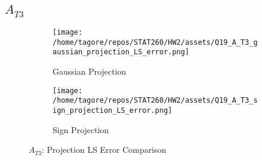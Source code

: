 \documentclass{article}
\begin{document}
\subsection*{\(A_{T3}\)}
\begin{figure}[H]
    \centering
    \begin{subfigure}[b]{0.48\textwidth}
        \centering
        \texttt{[image: /home/tagore/repos/STAT260/HW2/assets/Q19\_A\_T3\_gaussian\_projection\_LS\_error.png]}
        \caption{Gaussian Projection}
        \label{fig:Q19_AT3_gaussian}
    \end{subfigure}
    \hfill
    \begin{subfigure}[b]{0.48\textwidth}
        \centering
        \texttt{[image: /home/tagore/repos/STAT260/HW2/assets/Q19\_A\_T3\_sign\_projection\_LS\_error.png]}
        \caption{Sign Projection}
        \label{fig:Q19_AT3_sign}
    \end{subfigure}
    \caption{\(A_{T3}\): Projection LS Error Comparison}
    \label{fig:Q19_AT3}
\end{figure}
\end{document}
